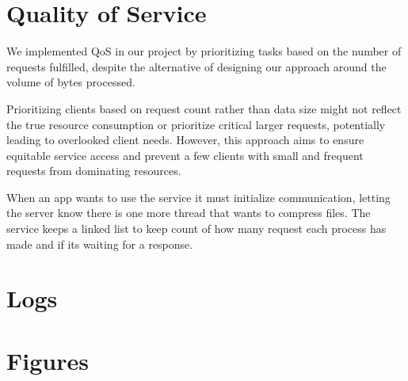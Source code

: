 \documentclass[12pt]{article}
\begin{document}
\section*{Quality of Service}
\par We implemented QoS in our project by prioritizing tasks based on the number of requests fulfilled, despite the alternative of designing our approach around the volume of bytes processed.

\par Prioritizing clients based on request count rather than data size might not reflect the true resource consumption or prioritize critical larger requests, potentially leading to overlooked client needs. However, this approach aims to ensure equitable service access and prevent a few clients with small and frequent requests from dominating resources.

\par When an app wants to use the service it must initialize communication, letting the server know there is one more thread that wants to compress files. The service keeps a linked list to keep count of how many request each process has made and if its waiting for a response. 

\section*{Logs}



\section*{Figures}
\end{document}
